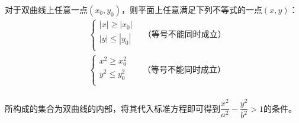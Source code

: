 \documentclass[UTF8]{ctexart}
\begin{document}
    对于双曲线上任意一点$(x_0,y_0)$，则平面上任意满足下列不等式的一点$(x,y)$：\vspace{5pt}
    \setcounter{equation}{0}
    \begin{align}
        &\begin{cases}
            |x|\geq|x_0|\\[1mm]
            |y|\leq|y_0|\\[1mm]
        \end{cases}~~~~\text{（等号不能同时成立）}\\[6mm]
        &\begin{cases}
            x^2\geq x_0^2\\[1mm]
            y^2\leq y_0^2\\[1mm]
        \end{cases}~~~~~~~\text{（等号不能同时成立）}
    \end{align}\\
    所构成的集合为双曲线的内部，将其代入标准方程即可得到$\dfrac{x^2}{a^2}-\dfrac{y^2}{b^2}>1$的条件。

\newpage
\end{document}
